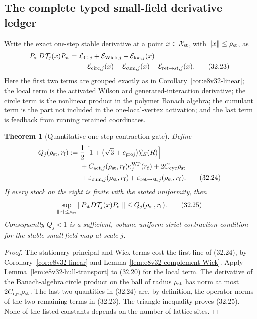 \documentclass[11pt,oneside]{book}
\newtheorem{theorem}{Theorem}[chapter]
\theoremstyle{definition}
\theoremstyle{remark}
\begin{document}
\subsection{The complete typed small-field derivative ledger}

Write the exact one-step stable derivative at a point
\(x\in{\cal X}_{\rm st}\), with \(\|x\|\leq\rho_{\rm st}\), as
\[
\begin{split}
 P_{\rm st}D{\cal T}_j(x)P_{\rm st}
 ={}&
 {\cal L}_{{\rm G},j}
 +{\cal E}_{{\rm Wick},j}
 +{\cal E}_{{\rm loc},j}(x)\\
 &+{\cal E}_{{\rm circ},j}(x)
 +{\cal E}_{{\rm cum},j}(x)
 +{\cal E}_{{\rm ret}\to{\rm st},j}(x).                         \tag{32.23}
\end{split}
\]
Here the first two terms are grouped exactly as in
Corollary~\ref{cor:e8v32-linear}; the local term is the activated
Wilson and generated-interaction derivative; the circle term is the
nonlinear product in the polymer Banach algebra; the cumulant term is
the part not included in the one-local-vertex activation; and the
last term is feedback from running retained coordinates.

\begin{theorem}[Quantitative one-step contraction gate]
\label{thm:e8v32-contraction-gate}
Define
\[
\begin{split}
 Q_j(\rho_{\rm st},r_{\rm f})
 :={}&
 \frac12\left[
 1+\bigl(\sqrt3+c_{\rm proj}\bigr)\widehat\chi_S(R)
 \right]\\
 &+
 C_{{\rm act},j}(\rho_{\rm st},r_{\rm f})
 \kappa_j^{\rm WP}(r_{\rm f})
 +2C_{\rm cyc}\rho_{\rm st}\\
 &+
 \varepsilon_{{\rm cum},j}(\rho_{\rm st},r_{\rm f})
 +\varepsilon_{{\rm ret}\to{\rm st},j}(\rho_{\rm st},r_{\rm f}).
                                                                    \tag{32.24}
\end{split}
\]
If every stock on the right is finite with the stated uniformity,
then
\[
 \sup_{\|x\|\leq\rho_{\rm st}}
 \|P_{\rm st}D{\cal T}_j(x)P_{\rm st}\|
 \leq Q_j(\rho_{\rm st},r_{\rm f}).                              \tag{32.25}
\]
Consequently \(Q_j<1\) is a sufficient, volume-uniform strict
contraction condition for the stable small-field map at scale \(j\).
\end{theorem}

\begin{proof}
The stationary principal and Wick terms cost the first line of
(32.24), by Corollary~\ref{cor:e8v32-linear} and
Lemma~\ref{lem:e8v32-complement-Wick}.  Apply
Lemma~\ref{lem:e8v32-hull-transport} to (32.20) for the local term.
The derivative of the Banach-algebra circle product on the ball of
radius \(\rho_{\rm st}\) has norm at most
\(2C_{\rm cyc}\rho_{\rm st}\).  The last two quantities in (32.24)
are, by definition, the operator norms of the two remaining terms in
(32.23).  The triangle inequality proves (32.25).  None of the
listed constants depends on the number of lattice sites.
\end{proof}
\end{document}
